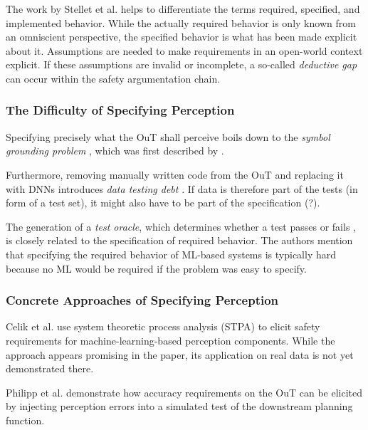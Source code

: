 \documentclass[conference]{IEEEtran}
\newcommand{\citeold}[1]{{\hypersetup{citecolor=black}\cite{#1}}}
\begin{document}
The work by Stellet et al. \cite{Stellet2019formalization} helps to differentiate the terms required, specified, and implemented behavior.
While the actually required behavior is only known from an omniscient perspective, the specified behavior is what has been made explicit about it. 
Assumptions are needed to make requirements in an open-world context explicit. 
If these assumptions are invalid or incomplete, a so-called \textit{deductive gap} can occur within the safety argumentation chain. 


\subsubsection{The Difficulty of Specifying Perception}

Specifying precisely what the OuT shall perceive boils down to the \textit{symbol grounding problem} \citeold{Salay2019partialspecifications}, which was first described by \cite{Harnad1990symbolgrounding}.

Furthermore, removing manually written code from the OuT and replacing it with DNNs introduces \textit{data testing debt} \cite{Sculley2015debt}. 
If data is therefore part of the tests (in form of a test set), it might also have to be part of the specification (?).

The generation of a \textit{test oracle}, which determines whether a test passes or fails \cite{Abrecht2021testing}, is closely related to the specification of required behavior. 
The authors mention that specifying the required behavior of ML-based systems is typically hard because no ML would be required if the problem was easy to specify.


\subsubsection{Concrete Approaches of Specifying Perception} 

Celik et al. \cite{Celik2022stpa} use system theoretic process analysis (STPA) to elicit safety requirements for machine-learning-based perception components. While the approach appears promising in the paper, its application on real data is not yet demonstrated there. 

Philipp et al. \cite{Philipp2021requirements} demonstrate how accuracy requirements on the OuT can be elicited by injecting perception errors into a simulated test of the downstream planning function. 
\end{document}
